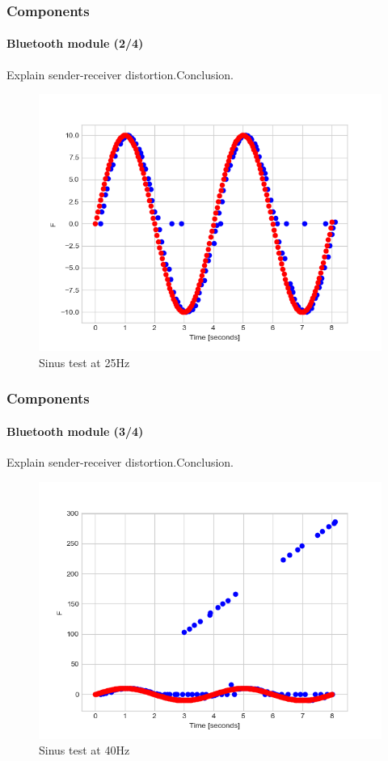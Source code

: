 \documentclass{beamer}
\begin{document}
\begin{frame}
\frametitle{Components}
\framesubtitle{Bluetooth module (2/4)}
Explain sender-receiver distortion.Conclusion.
\begin{figure}[hbtp]
\centering
\includegraphics[scale=0.4]{figures/sin-sending-merged-25hz.png}
\caption{Sinus test at 25Hz}
\end{figure}

\end{frame}


\begin{frame}
\frametitle{Components}
\framesubtitle{Bluetooth module (3/4)}
Explain sender-receiver distortion.Conclusion.
\begin{figure}[hbtp]
\centering
\includegraphics[scale=0.4]{figures/sin-sending-merged-40hz.png}
\caption{Sinus test at 40Hz}
\end{figure}

\end{frame}
\end{document}
